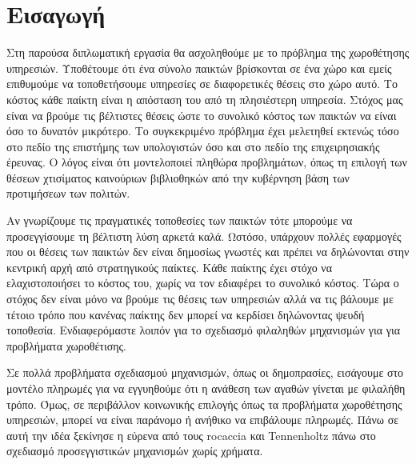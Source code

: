 
\section{Εισαγωγή}



Στη παρούσα διπλωματική εργασία θα ασχοληθούμε με το πρόβλημα της χωροθέτησης υπηρεσιών. Υποθέτουμε ότι ένα σύνολο παικτών βρίσκονται σε ένα χώρο και εμείς επιθυμούμε να τοποθετήσουμε υπηρεσίες σε διαφορετικές θέσεις στο χώρο αυτό. Το κόστος κάθε παίκτη είναι η απόσταση του από τη πλησιέστερη υπηρεσία. Στόχος μας είναι να βρούμε τις βέλτιστες θέσεις ώστε το συνολικό κόστος των παικτών να είναι όσο το δυνατόν μικρότερο. Το συγκεκριμένο πρόβλημα έχει μελετηθεί εκτενώς τόσο στο πεδίο της επιστήμης των υπολογιστών όσο και στο πεδίο της επιχειρησιακής έρευνας. Ο λόγος είναι ότι μοντελοποιεί πληθώρα προβλημάτων, όπως τη επιλογή των θέσεων χτισίματος καινούριων βιβλιοθηκών από την κυβέρνηση βάση των προτιμήσεων των πολιτών. 

Αν γνωρίζουμε τις πραγματικές τοποθεσίες των παικτών τότε μπορούμε να προσεγγίσουμε τη βέλτιστη λύση αρκετά καλά. Ωστόσο, υπάρχουν πολλές εφαρμογές που οι θέσεις των παικτών δεν είναι δημοσίως γνωστές και πρέπει να δηλώνονται στην κεντρική αρχή από στρατηγικούς παίκτες. Κάθε παίκτης έχει στόχο να ελαχιστοποιήσει το κόστος του, χωρίς να τον εδιαφέρει το συνολικό κόστος. Τώρα ο στόχος δεν είναι μόνο να βρούμε τις θέσεις των υπηρεσιών αλλά να τις βάλουμε με τέτοιο τρόπο που κανένας παίκτης δεν μπορεί να κερδίσει δηλώνοντας ψευδή τοποθεσία. Ενδιαφερόμαστε λοιπόν για το σχεδιασμό φιλαληθών μηχανισμών για για προβλήματα χωροθέτισης.

Σε πολλά προβλήματα σχεδιασμού μηχανισμών, όπως οι δημοπρασίες, εισάγουμε στο μοντέλο πληρωμές για να εγγυηθούμε ότι η ανάθεση των αγαθών γίνεται με φιλαλήθη τρόπο. Όμως, σε περιβάλλον κοινωνικής επιλογής όπως τα προβλήματα χωροθέτησης υπηρεσιών, μπορεί να είναι παράνομο ή ανήθικο να επιβάλουμε πληρωμές. Πάνω σε αυτή την ιδέα ξεκίνησε η εύρενα από τους rocaccia και Tennenholtz \cite{Procaccia2013} πάνω στο σχεδιασμό προσεγγιστικών μηχανισμών χωρίς χρήματα. 

